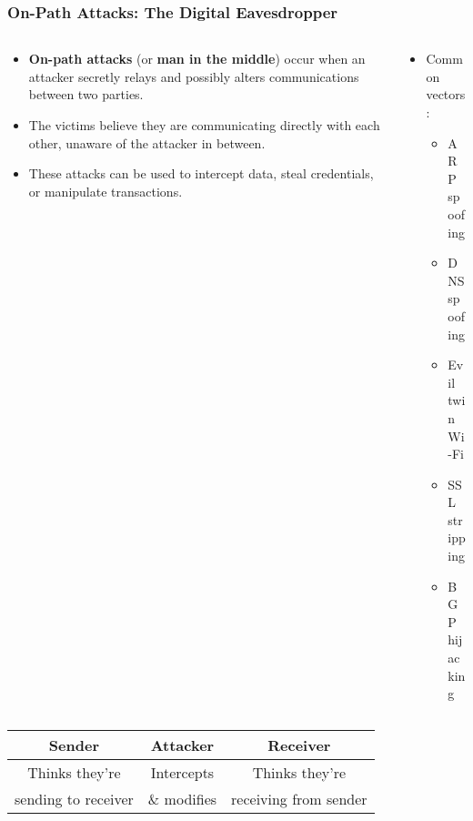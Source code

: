 \documentclass{beamer}
\begin{document}
\begin{frame}
    \frametitle{On-Path Attacks: The Digital Eavesdropper}
    
    \begin{columns}
        \begin{column}{0.6\textwidth}
            \begin{itemize}
                \item \textbf{On-path attacks} (or \textbf{man in the middle}) occur when an attacker secretly relays and possibly alters communications between two parties.
                \item The victims believe they are communicating directly with each other, unaware of the attacker in between.
                \item These attacks can be used to intercept data, steal credentials, or manipulate transactions.
            \end{itemize}
        \end{column}
        \begin{column}{0.4\textwidth}
            \begin{itemize}
                \item Common vectors:
                    \begin{itemize}
                        \item ARP spoofing
                        \item DNS spoofing
                        \item Evil twin Wi-Fi
                        \item SSL stripping
                        \item BGP hijacking
                    \end{itemize}
            \end{itemize}
        \end{column}
    \end{columns}
    
    \begin{center}
        \begin{tabular}{c|c|c}
            Sender & Attacker & Receiver \\
            \hline
            Thinks they're & Intercepts & Thinks they're \\
            sending to receiver & \& modifies & receiving from sender \\
        \end{tabular}
    \end{center}
\end{frame}
\end{document}
